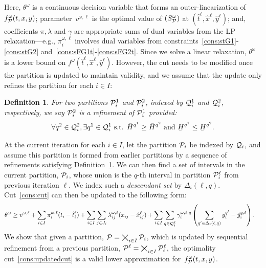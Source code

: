 \documentclass[11pt]{article}
\newtheorem{definition}{Definition}
\newcommand{\cQ}{{\cal Q}}
\newcommand{\noi}{\noindent}
\newcommand{\cP}{{\cal P}}
\renewcommand{\underbar}{\underaccent{\bar}}
\begin{document}
	Here, $\theta^\omega$ is a continuous decision variable that forms an outer-linearization of $f^\omega_{\cP}(t,x,y)$; parameter~$v^{\omega,\ell}$ is the optimal value of \((S_{\cP}^\omega)\) at $(\hat{t}^\ell,\hat{x}^\ell,\hat{y}^\ell)$; and, coefficients \(\pi,\lambda\) and \(\gamma\) are appropriate sums of dual variables from the LP relaxation---e.g., $\pi_i^{\omega,\ell}$ involves dual variables from constraints~\eqref{cons:stG1}-\eqref{cons:stG2} and~\eqref{cons:sFG1t}-\eqref{cons:sFG2t}.
	Since we solve a linear relaxation, \(\theta^\omega\) is a lower bound on \(f^\omega(\hat{t}^\ell,\hat{x}^\ell,\hat{y}^\ell)\). However, the cut needs to be modified once the partition is updated to maintain validity, and we assume that the update only refines the partition for each \(i \in I\):
	\begin{definition} \label{definition:refinement}
		For two partitions \(\cP^1_i\) and \(\cP^2_i\), indexed by \(\cQ^1_i\) and \(\cQ^2_i\), respectively, we say \(\cP^2_i\) is a {\em refinement} of \(\cP^1_i\) provided:
		\begin{equation*}
		\forall q^2 \in \cQ^2_i, \exists q^1 \in \cQ^1_i \text{ s.t. } \bar{H}^{q^1} \geq \bar{H}^{q^2} \text{ and } {\underbar{H}^{q^1} \leq \underbar{H}^{q^2}}.
		\end{equation*}
	\end{definition}
	\noi At the current iteration for each \(i \in I\), let the partition \(\cP_i\) be indexed by \(\cQ_i\), and assume this partition is formed from earlier partitions by a sequence of refinements satisfying Definition~\ref{definition:refinement}. We can then find a set of intervals in the current partition,  \(\cP_i\), whose union is the \(q\)-th interval in partition \(\cP^\ell_i\) from previous iteration \(\ell\). We index such a {\em descendant set} by \(\Delta_i(\ell,q)\). Cut~\eqref{cons:cut} can then be updated to the following form:
	\begin{align} \label{cons:updatedcut}
	& \theta^\omega \geq v^{\omega,\ell} + \sum_{i \in I} \pi_i^{\omega,\ell} (t_i - \hat{t}_i^{\ell}) + \sum_{i \in I} \sum_{j \in J_i} \lambda_{ij}^{\omega,\ell} (x_{ij} - \hat{x}_{ij}^{\ell}) + %
	\sum_{i \in I} \sum_{q \in \cQ^{\ell}_i} \gamma_{i}^{\omega,\ell,q} \left( \sum_{q^\prime \in \Delta_i(\ell,q)} y_i^{q^\prime} - \hat{y}_i^{q,\ell} \right). %
	\end{align}
	We show that given a partition, \(\cP=\bigtimes_{i \in I} \cP_i\), which is updated by sequential refinement from a previous partition, \(\cP^\ell = \bigtimes_{i \in I} \cP_i^\ell\), the optimality cut~\eqref{cons:updatedcut} is a valid lower approximation for~$f^\omega_{\cP}(t,x,y)$.
\end{document}
